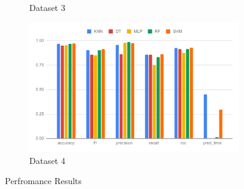 \documentclass[a4paper,fleqn]{cas-dc}
\begin{document}
\begin{figure}[H]
\begin{subfigure}{\columnwidth}
        \caption{Dataset 3}\label{fig:performance_results_dataset_3}
    \end{subfigure}
    \begin{subfigure}{\columnwidth}
        \includegraphics[width=0.9\columnwidth]{perf_ds_4.pdf}
        \caption{Dataset 4}\label{fig:performance_results_dataset_4}
    \end{subfigure}
    \caption{Perfromance Results}\label{fig:performance_results}
\end{figure}
\end{document}
